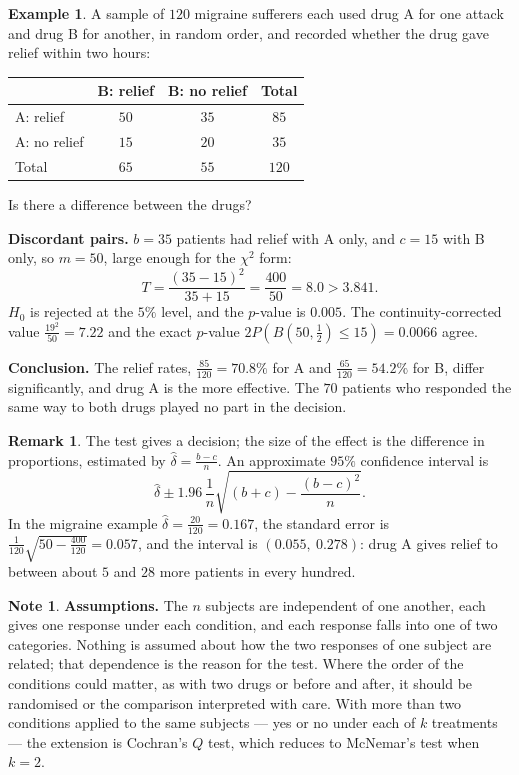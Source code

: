 \documentclass[11pt,a4paper]{article}
\theoremstyle{definition}
\newtheorem{example}[thm]{Example}
\newtheorem{note}[thm]{Note}
\newtheorem{remark}[thm]{Remark}
\begin{document}
\begin{example}
A sample of $120$ migraine sufferers each used drug A for one attack and drug B for
another, in random order, and recorded whether the drug gave relief within two hours:
\begin{center}
\begin{tabular}{l|cc|c}
 & B: relief & B: no relief & Total\\\hline
A: relief & $50$ & $35$ & $85$\\
A: no relief & $15$ & $20$ & $35$\\\hline
Total & $65$ & $55$ & $120$
\end{tabular}
\end{center}
Is there a difference between the drugs?

\textbf{Discordant pairs.} $b = 35$ patients had relief with A only, and $c = 15$ with B
only, so $m = 50$, large enough for the $\chi^{2}$ form:
\[T = \frac{(35-15)^{2}}{35+15} = \frac{400}{50} = 8.0 > 3.841.\]
$H_0$ is rejected at the $5\%$ level, and the $p$-value is $0.005$. The continuity-corrected
value $\frac{19^{2}}{50} = 7.22$ and the exact $p$-value
$2P\left(B\left(50,\tfrac12\right)\leq 15\right) = 0.0066$ agree.

\textbf{Conclusion.} The relief rates, $\frac{85}{120} = 70.8\%$ for A and
$\frac{65}{120} = 54.2\%$ for B, differ significantly, and drug A is the more effective.
The $70$ patients who responded the same way to both drugs played no part in the
decision.
\end{example}

\begin{remark}
The test gives a decision; the size of the effect is the difference in proportions,
estimated by $\hat\delta = \frac{b-c}{n}$. An approximate $95\%$ confidence interval is
\[\hat\delta\pm 1.96\,\frac{1}{n}\sqrt{(b+c)-\frac{(b-c)^{2}}{n}}.\]
In the migraine example $\hat\delta = \frac{20}{120} = 0.167$, the standard error is
$\frac{1}{120}\sqrt{50-\frac{400}{120}} = 0.057$, and the interval is
$(0.055,\ 0.278)$: drug A gives relief to between about $5$ and $28$ more patients in
every hundred.
\end{remark}

\begin{note}
\textbf{Assumptions.} The $n$ subjects are independent of one another, each gives one
response under each condition, and each response falls into one of two categories.
Nothing is assumed about how the two responses of one subject are related; that
dependence is the reason for the test. Where the order of the conditions could matter,
as with two drugs or before and after, it should be randomised or the comparison
interpreted with care. With more than two conditions applied to the same subjects
--- yes or no under each of $k$ treatments --- the extension is Cochran's $Q$ test,
which reduces to McNemar's test when $k = 2$.
\end{note}
\end{document}
